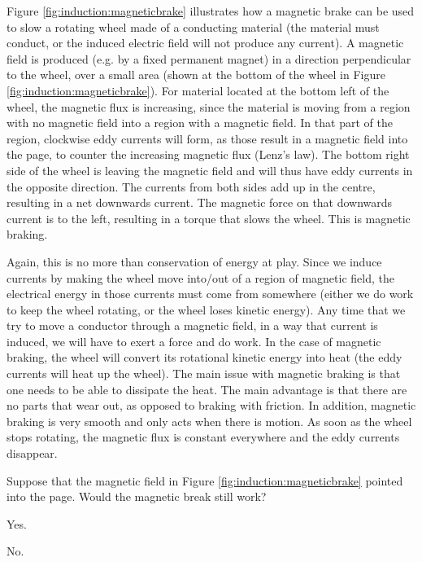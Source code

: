 Figure \ref{fig:induction:magneticbrake} illustrates how a magnetic brake can be used to slow a rotating wheel made of a conducting material (the material must conduct, or the induced electric field will not produce any current). A magnetic field is produced (e.g. by a fixed permanent magnet) in a direction perpendicular to the wheel, over a small area (shown at the bottom of the wheel in Figure \ref{fig:induction:magneticbrake}).
For material located at the bottom left of the wheel, the magnetic flux is increasing, since the material is moving from a region with no magnetic field into a region with a magnetic field. In that part of the region, clockwise eddy currents will form, as those result in a magnetic field into the page, to counter the increasing magnetic flux (Lenz's law). The bottom right side of the wheel is leaving the magnetic field and will thus have eddy currents in the opposite direction. The currents from both sides add up in the centre, resulting in a net downwards current. The magnetic force on that downwards current is to the left, resulting in a torque that slows the wheel. This is magnetic braking.

Again, this is no more than conservation of energy at play. Since we induce currents by making the wheel move into/out of a region of magnetic field, the electrical energy in those currents must come from somewhere (either we do work to keep the wheel rotating, or the wheel loses kinetic energy). Any time that we try to move a conductor through a magnetic field, in a way that current is induced, we will have to exert a force and do work. In the case of magnetic braking, the wheel will convert its rotational kinetic energy into heat (the eddy currents will heat up the wheel). The main issue with magnetic braking is that one needs to be able to dissipate the heat. The main advantage is that there are no parts that wear out, as opposed to braking with friction. In addition, magnetic braking is very smooth and only acts when there is motion. As soon as the wheel stops rotating, the magnetic flux is constant everywhere and the eddy currents disappear.

\begin{checkpoint}{}
	\begin{MCquestion}{Suppose that the magnetic field in Figure \ref{fig:induction:magneticbrake} pointed into the page. Would the magnetic break still work?}
		\item Yes. \correct
		\item No.
	\end{MCquestion}
\end{checkpoint}

